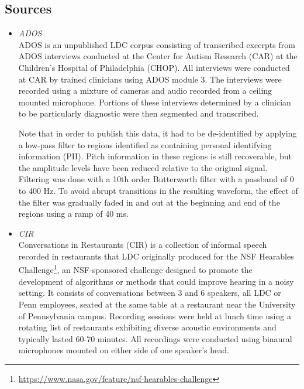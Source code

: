 \documentclass{article}
\begin{document}
\begin{appendices}
\subsection*{Sources}
    \begin{itemize}
        \item {\it ADOS} \\
            ADOS is an unpublished LDC corpus consisting of transcribed excerpts from ADOS interviews conducted at the Center for Autism Research (CAR) at the Children's Hospital of Philadelphia (CHOP). All interviews were conducted at CAR by trained clinicians using ADOS module 3. The interviews were recorded using a mixture of cameras and audio recorded from a ceiling mounted microphone. Portions of these interviews determined by a clinician to be particularly diagnostic were then segmented and transcribed.
            
            Note that in order to publish this data, it had to be de-identified by applying a low-pass filter to regions identified as containing personal identifying information (PII). Pitch information in these regions is still recoverable, but the amplitude levels have been reduced relative to the original signal. Filtering was done with a 10th order Butterworth filter with a passband of 0 to 400 Hz. To avoid abrupt transitions in the resulting waveform, the effect of the filter was gradually faded in and out at the beginning and end of the regions using a ramp of 40 ms.
        \item {\it CIR} \\
            Conversations in Restaurants (CIR) is a collection of informal speech recorded in restaurants that LDC originally produced for the NSF Hearables Challenge\footnote{\url{https://www.nasa.gov/feature/nsf-hearables-challenge}}, an NSF-sponsored challenge designed to promote the development of algorithms or methods that could improve hearing in a noisy setting. It consists of conversations between 3 and 6 speakers, all LDC or Penn employees, seated at the same table at a restaurant near the University of Pennsylvania campus. Recording sessions were held at lunch time using a rotating list of restaurants exhibiting diverse acoustic environments and typically lasted 60-70 minutes. All recordings were conducted using binaural microphones mounted on either side of one speaker's head. 
        

\end{itemize}
\end{appendices}
\end{document}
